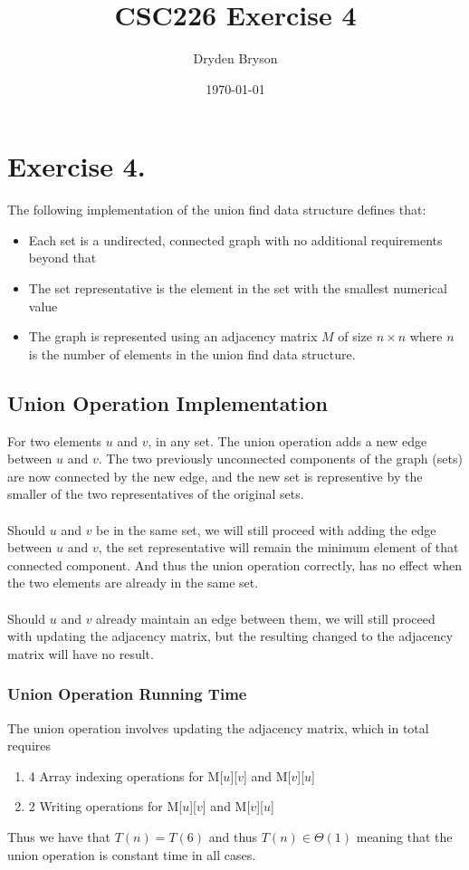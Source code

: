 \documentclass{article}
\title{CSC226 Exercise 4}
\author{Dryden Bryson}
\date{\today}
\begin{document}
\maketitle
\newpage
\section*{Exercise 4.}
The following implementation of the union find data structure defines that:
\begin{itemize}
    \item Each set is a undirected, connected graph with no additional requirements beyond that
    \item The set representative is the element in the set with the smallest numerical value
    \item The graph is represented using an adjacency matrix $M$ of size $n \times n$ where $n$ is the number of elements in the union find data structure.
\end{itemize}


\subsection*{Union Operation Implementation}
For two elements $u$ and $v$, in any set. The union operation adds a new edge between $u$ and $v$. The two previously unconnected components of the graph (sets) are now connected by the new edge, and the new set is representive by the smaller of the two representatives of the original sets.\\\\
Should $u$ and $v$ be in the same set, we will still proceed with adding the edge between $u$ and $v$, the set representative will remain the minimum element of that connected component. And thus the union operation correctly, has no effect when the two elements are already in the same set.\\\\
Should $u$ and $v$ already maintain an edge between them, we will still proceed with updating the adjacency matrix, but the resulting changed to the adjacency matrix will have no result.
\subsubsection*{Union Operation Running Time}
The union operation involves updating the adjacency matrix, which in total requires 
\begin{enumerate}[i]
    \item 4 Array indexing operations for M[$u$][$v$] and M[$v$][$u$]
    \item 2 Writing operations for M[$u$][$v$] and M[$v$][$u$]
\end{enumerate}
Thus we have that $T(n)=T(6)$ and thus $T(n)\in \Theta(1)$ meaning that the union operation is constant time in all cases.\\\\
\end{document}
